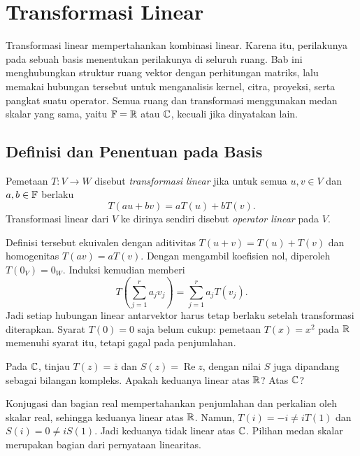 \chapter{Transformasi Linear}
\label{ch:transformasi-linear}

Transformasi linear mempertahankan kombinasi linear. Karena itu,
perilakunya pada sebuah basis menentukan perilakunya di seluruh
ruang. Bab ini menghubungkan struktur ruang vektor dengan perhitungan
matriks, lalu memakai hubungan tersebut untuk menganalisis kernel,
citra, proyeksi, serta pangkat suatu operator.
Semua ruang dan transformasi menggunakan medan skalar yang sama,
yaitu $\mathbb{F}=\mathbb{R}$ atau $\mathbb{C}$, kecuali jika dinyatakan lain.

\section{Definisi dan Penentuan pada Basis}

\begin{definisi}
    Pemetaan $T:V\to W$ disebut \emph{transformasi linear} jika
    untuk semua $u,v\in V$ dan $a,b\in\mathbb{F}$ berlaku
    \[
        T(au+bv)=aT(u)+bT(v).
    \]
    Transformasi linear dari $V$ ke dirinya sendiri disebut
    \emph{operator linear} pada $V$.
\end{definisi}

Definisi tersebut ekuivalen dengan aditivitas
$T(u+v)=T(u)+T(v)$ dan homogenitas $T(av)=aT(v)$.
Dengan mengambil koefisien nol, diperoleh $T(0_V)=0_W$.
Induksi kemudian memberi
\[
    T\left(\sum_{j=1}^r a_jv_j\right)
      =\sum_{j=1}^r a_jT(v_j).
\]
Jadi setiap hubungan linear antarvektor harus tetap berlaku
setelah transformasi diterapkan. Syarat $T(0)=0$ saja belum
cukup: pemetaan $T(x)=x^2$ pada $\mathbb{R}$ memenuhi syarat itu,
tetapi gagal pada penjumlahan.

\begin{exam}
    Pada $\mathbb{C}$, tinjau $T(z)=\overline z$ dan $S(z)=\operatorname{Re}z$,
    dengan nilai $S$ juga dipandang sebagai bilangan kompleks.
    Apakah keduanya linear atas $\mathbb{R}$? Atas $\mathbb{C}$?
\end{exam}
\begin{solution}
    Konjugasi dan bagian real mempertahankan penjumlahan dan
    perkalian oleh skalar real, sehingga keduanya linear atas $\mathbb{R}$.
    Namun, $T(i)=-i\ne iT(1)$ dan $S(i)=0\ne iS(1)$.
    Jadi keduanya tidak linear atas $\mathbb{C}$.
    Pilihan medan skalar merupakan bagian dari pernyataan linearitas.
\end{solution}

